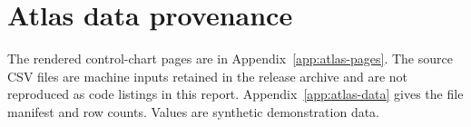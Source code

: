 \chapter{Atlas data provenance}\label{app:atlas-data-legacy}

The rendered control-chart pages are in Appendix~\ref{app:atlas-pages}. The source CSV files are machine inputs retained in the release archive and are not reproduced as code listings in this report. Appendix~\ref{app:atlas-data} gives the file manifest and row counts. Values are synthetic demonstration data.

